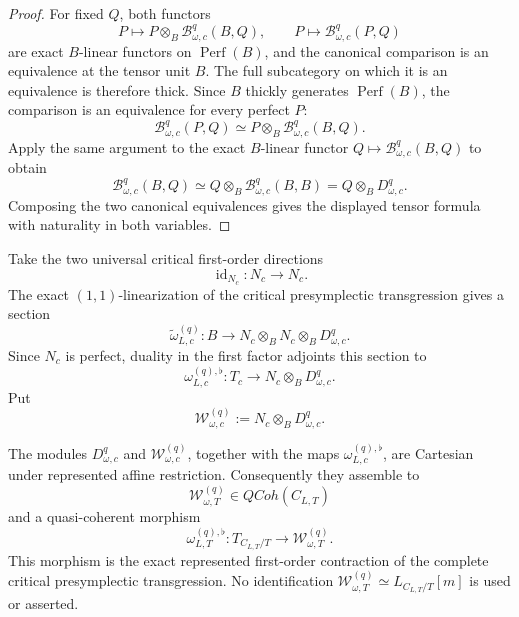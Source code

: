 \begin{proof}
For fixed $Q$, both functors
\[
P\longmapsto
P\otimes_B\mathscr B_{\omega,c}^{q}(B,Q),
\qquad
P\longmapsto
\mathscr B_{\omega,c}^{q}(P,Q)
\]
are exact $B$-linear functors on $\operatorname{Perf}(B)$, and the canonical
comparison is an equivalence at the tensor unit $B$.  The full subcategory on which
it is an equivalence is therefore thick.  Since $B$ thickly generates
$\operatorname{Perf}(B)$, the comparison is an equivalence for every perfect $P$:
\[
\mathscr B_{\omega,c}^{q}(P,Q)
\simeq
P\otimes_B\mathscr B_{\omega,c}^{q}(B,Q).
\]
Apply the same argument to the exact $B$-linear functor
$Q\mapsto\mathscr B_{\omega,c}^{q}(B,Q)$ to obtain
\[
\mathscr B_{\omega,c}^{q}(B,Q)
\simeq
Q\otimes_B\mathscr B_{\omega,c}^{q}(B,B)
=
Q\otimes_BD_{\omega,c}^{q}.
\]
Composing the two canonical equivalences gives the displayed tensor formula with
naturality in both variables.
\end{proof}

\begin{construction}
\label{constr:symmetry-noether-affine-point-presymplectic-contraction-morphism}
Take the two universal critical first-order directions
\[
\operatorname{id}_{N_c}:N_c\longrightarrow N_c.
\]
The exact $(1,1)$-linearization of the critical presymplectic transgression gives a
section
\[
\widetilde\omega_{L,c}^{(q)}:
B
\longrightarrow
N_c\otimes_BN_c\otimes_BD_{\omega,c}^{q}.
\]
Since $N_c$ is perfect, duality in the first factor adjoints this section to
\[
\boxed{
\omega_{L,c}^{(q),\flat}:
T_c
\longrightarrow
N_c\otimes_BD_{\omega,c}^{q}.
}
\]
Put
\[
\mathcal W_{\omega,c}^{(q)}
:=
N_c\otimes_BD_{\omega,c}^{q}.
\]
\end{construction}

\begin{proposition}
\label{prop:symmetry-noether-affine-point-descent-presymplectic-contraction-target}
The modules $D_{\omega,c}^{q}$ and $\mathcal W_{\omega,c}^{(q)}$, together with the
maps $\omega_{L,c}^{(q),\flat}$, are Cartesian under represented affine restriction.
Consequently they assemble to
\[
\boxed{
\mathcal W_{\omega,T}^{(q)}\in QCoh(C_{L,T})
}
\]
and a quasi-coherent morphism
\[
\boxed{
\omega_{L,T}^{(q),\flat}:
T_{C_{L,T}/T}
\longrightarrow
\mathcal W_{\omega,T}^{(q)}.
}
\]
This morphism is the exact represented first-order contraction of the complete
critical presymplectic transgression.  No identification
$\mathcal W_{\omega,T}^{(q)}\simeq L_{C_{L,T}/T}[m]$ is used or asserted.
\end{proposition}

